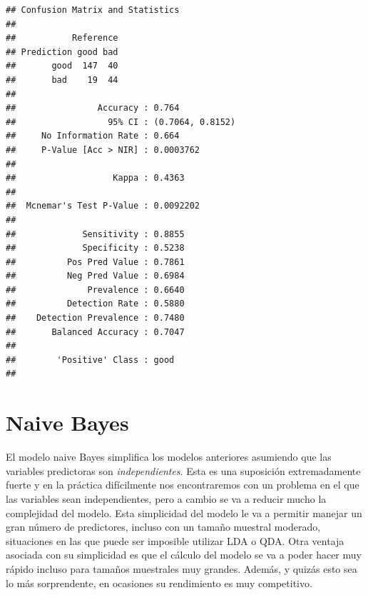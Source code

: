 \documentclass[
]{book}
\newenvironment{Shaded}{\begin{snugshade}}{\end{snugshade}}
\newcommand{\NormalTok}[1]{#1}
\newcommand{\OperatorTok}[1]{\textcolor[rgb]{0.81,0.36,0.00}{\textbf{#1}}}
\theoremstyle{break}
\theoremstyle{definition}
\theoremstyle{definition}
\theoremstyle{definition}
\theoremstyle{remark}
\begin{document}
\begin{verbatim}
## Confusion Matrix and Statistics
## 
##           Reference
## Prediction good bad
##       good  147  40
##       bad    19  44
##                                           
##                Accuracy : 0.764           
##                  95% CI : (0.7064, 0.8152)
##     No Information Rate : 0.664           
##     P-Value [Acc > NIR] : 0.0003762       
##                                           
##                   Kappa : 0.4363          
##                                           
##  Mcnemar's Test P-Value : 0.0092202       
##                                           
##             Sensitivity : 0.8855          
##             Specificity : 0.5238          
##          Pos Pred Value : 0.7861          
##          Neg Pred Value : 0.6984          
##              Prevalence : 0.6640          
##          Detection Rate : 0.5880          
##    Detection Prevalence : 0.7480          
##       Balanced Accuracy : 0.7047          
##                                           
##        'Positive' Class : good            
## 
\end{verbatim}

\begin{Shaded}
\end{Shaded}

\hypertarget{naive-bayes}{%
\section{Naive Bayes}\label{naive-bayes}}

El modelo naive Bayes simplifica los modelos anteriores asumiendo que las variables predictoras son \emph{independientes}. Esta es una suposición extremadamente fuerte y en la práctica difícilmente nos encontraremos con un problema en el que las variables sean independientes, pero a cambio se va a reducir mucho la complejidad del modelo. Esta simplicidad del modelo le va a permitir manejar un gran número de predictores, incluso con un tamaño muestral moderado, situaciones en las que puede ser imposible utilizar LDA o QDA. Otra ventaja asociada con su simplicidad es que el cálculo del modelo se va a poder hacer muy rápido incluso para tamaños muestrales muy grandes. Además, y quizás esto sea lo más sorprendente, en ocasiones su rendimiento es muy competitivo.
\end{document}
